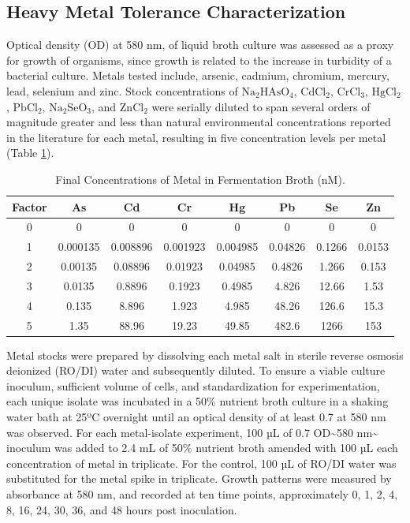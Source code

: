 \documentclass[ms, hidelinks]{uncgdissertationexp}
\theoremstyle{plain}
\theoremstyle{definition}
\theoremstyle{remark}
\begin{document}
\hypertarget{heavy-metal-tolerance-characterization}{%
\subsection{Heavy Metal Tolerance Characterization}\label{heavy-metal-tolerance-characterization}}

Optical density (OD) at 580 nm, of liquid broth culture was assessed as a proxy for growth of organisms, since growth is related to the increase in turbidity of a bacterial culture. Metals tested include, arsenic, cadmium, chromium, mercury, lead, selenium and zinc. Stock concentrations of \(\mathrm{Na_2HAsO_4}\), \(\mathrm{CdCl_2}\), \(\mathrm{CrCl_3}\), \(\mathrm{HgCl_2}\), \(\mathrm{PbCl_2}\), \(\mathrm{Na_2SeO_3}\), and \(\mathrm{ZnCl_2}\) were serially diluted to span several orders of magnitude greater and less than natural environmental concentrations reported in the literature for each metal, resulting in five concentration levels per metal (Table \ref{tab:metals}).
\begin{table}[htbp]
\caption[Final Concentrations of Metal in Fermentation Broth.]{Final Concentrations of Metal in Fermentation Broth (nM).}\label{tab:metals}
\centering
\begin{tabular}{cccccccc}
\toprule
Factor & As & Cd & Cr & Hg & Pb & Se & Zn\\
\midrule
0 & 0 & 0 & 0 & 0 & 0 & 0 & 0\\ 
1 & 0.000135 & 0.008896 & 0.001923 & 0.004985 & 0.04826 & 0.1266 & 0.0153\\
2 & 0.00135 & 0.08896 & 0.01923 & 0.04985 & 0.4826 & 1.266 & 0.153\\
3 & 0.0135 & 0.8896 & 0.1923 & 0.4985 & 4.826 & 12.66 & 1.53\\
4 & 0.135 & 8.896 & 1.923 & 4.985 & 48.26 & 126.6 & 15.3\\
5 & 1.35 & 88.96 & 19.23 & 49.85 & 482.6 & 1266 & 153\\
\bottomrule
\end{tabular}
\end{table}

Metal stocks were prepared by dissolving each metal salt in sterile reverse osmosis deionized (RO/DI) water and subsequently diluted. To ensure a viable culture inoculum, sufficient volume of cells, and standardization for experimentation, each unique isolate was incubated in a 50\% nutrient broth culture in a shaking water bath at 25ºC overnight until an optical density of at least 0.7 at 580 nm was observed. For each metal-isolate experiment, 100 µL of 0.7 OD\textasciitilde580 nm\textasciitilde{} inoculum was added to 2.4 mL of 50\% nutrient broth amended with 100 µL each concentration of metal in triplicate. For the control, 100 µL of RO/DI water was substituted for the metal spike in triplicate. Growth patterns were measured by absorbance at 580 nm, and recorded at ten time points, approximately 0, 1, 2, 4, 8, 16, 24, 30, 36, and 48 hours post inoculation.
\end{document}

